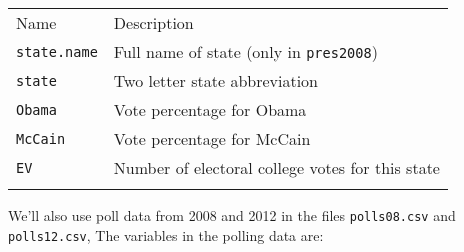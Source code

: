 \documentclass[]{article}
\begin{document}
\begin{longtable}[c]{@{}ll@{}}
\toprule\addlinespace
\begin{minipage}[b]{0.25\columnwidth}\raggedright
Name
\end{minipage} & \begin{minipage}[b]{0.68\columnwidth}\raggedright
Description
\end{minipage}
\\\addlinespace
\midrule\endhead
\begin{minipage}[t]{0.25\columnwidth}\raggedright
\texttt{state.name}
\end{minipage} & \begin{minipage}[t]{0.68\columnwidth}\raggedright
Full name of state (only in \texttt{pres2008})
\end{minipage}
\\\addlinespace
\begin{minipage}[t]{0.25\columnwidth}\raggedright
\texttt{state}
\end{minipage} & \begin{minipage}[t]{0.68\columnwidth}\raggedright
Two letter state abbreviation
\end{minipage}
\\\addlinespace
\begin{minipage}[t]{0.25\columnwidth}\raggedright
\texttt{Obama}
\end{minipage} & \begin{minipage}[t]{0.68\columnwidth}\raggedright
Vote percentage for Obama
\end{minipage}
\\\addlinespace
\begin{minipage}[t]{0.25\columnwidth}\raggedright
\texttt{McCain}
\end{minipage} & \begin{minipage}[t]{0.68\columnwidth}\raggedright
Vote percentage for McCain
\end{minipage}
\\\addlinespace
\begin{minipage}[t]{0.25\columnwidth}\raggedright
\texttt{EV}
\end{minipage} & \begin{minipage}[t]{0.68\columnwidth}\raggedright
Number of electoral college votes for this state
\end{minipage}
\\\addlinespace
\bottomrule
\end{longtable}

We'll also use poll data from 2008 and 2012 in the files
\texttt{polls08.csv} and \texttt{polls12.csv}, The variables in the
polling data are:
\end{document}
